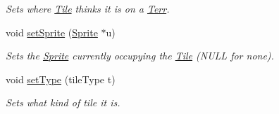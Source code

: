\begin{DoxyCompactItemize}
\begin{DoxyCompactList}\small\item\em Sets where \hyperlink{class_tile}{Tile} thinks it is on a \hyperlink{class_terr}{Terr}. \end{DoxyCompactList}\item 
void \hyperlink{class_tile_ad85c92ea426639130cc1d0d38641da3c}{set\+Sprite} (\hyperlink{class_sprite}{Sprite} $\ast$u)\hypertarget{class_tile_ad85c92ea426639130cc1d0d38641da3c}{}\label{class_tile_ad85c92ea426639130cc1d0d38641da3c}

\begin{DoxyCompactList}\small\item\em Sets the \hyperlink{class_sprite}{Sprite} currently occupying the \hyperlink{class_tile}{Tile} (N\+U\+LL for none). \end{DoxyCompactList}\item 
void \hyperlink{class_tile_a2557595d030a43cf9b5334df3b7264f7}{set\+Type} (tile\+Type t)\hypertarget{class_tile_a2557595d030a43cf9b5334df3b7264f7}{}\label{class_tile_a2557595d030a43cf9b5334df3b7264f7}

\begin{DoxyCompactList}\small\item\em Sets what kind of tile it is. \end{DoxyCompactList}\end{DoxyCompactItemize}
